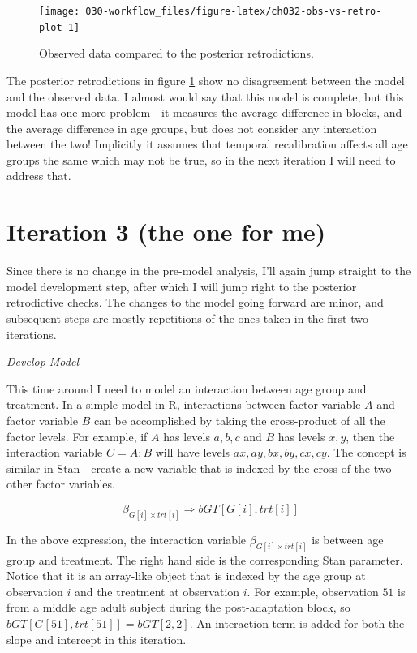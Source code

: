 \documentclass[11pt, oneside, openany]{scrbook}
\begin{document}
\begin{figure}

{\centering \texttt{[image: 030-workflow\_files/figure-latex/ch032-obs-vs-retro-plot-1]} 

}

\caption{Observed data compared to the posterior retrodictions.}\label{fig:ch032-obs-vs-retro-plot}
\end{figure}

The posterior retrodictions in figure \ref{fig:ch032-obs-vs-retro-plot} show no disagreement between the model and the observed data. I almost would say that this model is complete, but this model has one more problem - it measures the average difference in blocks, and the average difference in age groups, but does not consider any interaction between the two! Implicitly it assumes that temporal recalibration affects all age groups the same which may not be true, so in the next iteration I will need to address that.

\hypertarget{iter3}{%
\section{Iteration 3 (the one for me)}\label{iter3}}

Since there is no change in the pre-model analysis, I'll again jump straight to the model development step, after which I will jump right to the posterior retrodictive checks. The changes to the model going forward are minor, and subsequent steps are mostly repetitions of the ones taken in the first two iterations.

\emph{Develop Model}

This time around I need to model an interaction between age group and treatment. In a simple model in R, interactions between factor variable \(A\) and factor variable \(B\) can be accomplished by taking the cross-product of all the factor levels. For example, if \(A\) has levels \(a, b, c\) and \(B\) has levels \(x, y\), then the interaction variable \(C=A:B\) will have levels \(ax, ay, bx, by, cx, cy\). The concept is similar in Stan - create a new variable that is indexed by the cross of the two other factor variables.


\[
\beta_{G[i] \times trt[i]} \Longrightarrow bGT[G[i], trt[i]] 
\]

In the above expression, the interaction variable \(\beta_{G[i] \times trt[i]}\) is between age group and treatment. The right hand side is the corresponding Stan parameter. Notice that it is an array-like object that is indexed by the age group at observation \(i\) and the treatment at observation \(i\). For example, observation \(51\) is from a middle age adult subject during the post-adaptation block, so \(bGT[G[51], trt[51]] = bGT[2, 2]\). An interaction term is added for both the slope and intercept in this iteration.
\end{document}
